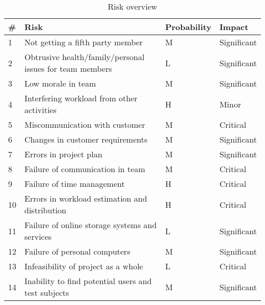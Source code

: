 \begin{table}
\begin{tabularx}{\textwidth}{ | l | X | l | l | }
  \hline
  \textbf{\#} & \textbf{Risk} & \textbf{Probability} & \textbf{Impact} \\ \hline
  1 & Not getting a fifth party member & M & Significant \\ \hline
  2 & Obtrusive health/family/personal issues for team members & L & Significant \\ \hline
  3 & Low morale in team & M & Significant \\ \hline
  4 & Interfering workload from other activities & H & Minor \\ \hline
  5 & Miscommunication with customer & M & Critical \\ \hline
  6 & Changes in customer requirements & M & Significant \\ \hline
  7 & Errors in project plan & M & Significant \\ \hline
  8 & Failure of communication in team & M & Critical \\ \hline
  9 & Failure of time management & H & Critical \\ \hline
 10 & Errors in workload estimation and distribution & H & Critical \\ \hline
 11 & Failure of online storage systems and services & L & Significant \\ \hline
 12 & Failure of personal computers & M & Significant \\ \hline
 13 & Infeasibility of project as a whole & L & Critical \\ \hline
 14 & Inability to find potential users and test subjects & M & Significant \\ \hline
\end{tabularx}
\caption{Risk overview}
\end{table}


